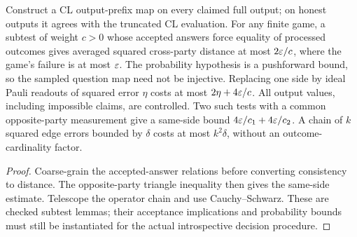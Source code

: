 \begin{lemma}
\label{lem:intro-subtest-estimates}
\leanok
Construct a CL output-prefix map on every claimed full output; on honest outputs
it agrees with the truncated CL evaluation. For any finite game, a subtest of
weight $c>0$ whose accepted answers force equality of processed outcomes gives
averaged squared cross-party distance at most $2\varepsilon/c$, where the game's
failure is at most $\varepsilon$. The probability hypothesis is a pushforward bound,
so the sampled question map need not be injective. Replacing one side by ideal
Pauli readouts of squared error $\eta$ costs at most $2\eta+4\varepsilon/c$.
All output values, including impossible claims, are controlled. Two such tests
with a common opposite-party measurement give a same-side bound
$4\varepsilon/c_1+4\varepsilon/c_2$. A chain of $k$ squared edge errors bounded by $\delta$
costs at most $k^2\delta$, without an outcome-cardinality factor.
\end{lemma}
\begin{proof}
\leanok
Coarse-grain the accepted-answer relations before converting consistency to
distance. The opposite-party triangle inequality then gives the same-side
estimate. Telescope the operator chain and use Cauchy--Schwarz. These are
checked subtest lemmas; their acceptance implications and probability bounds
must still be instantiated for the actual introspective decision procedure.
\end{proof}

